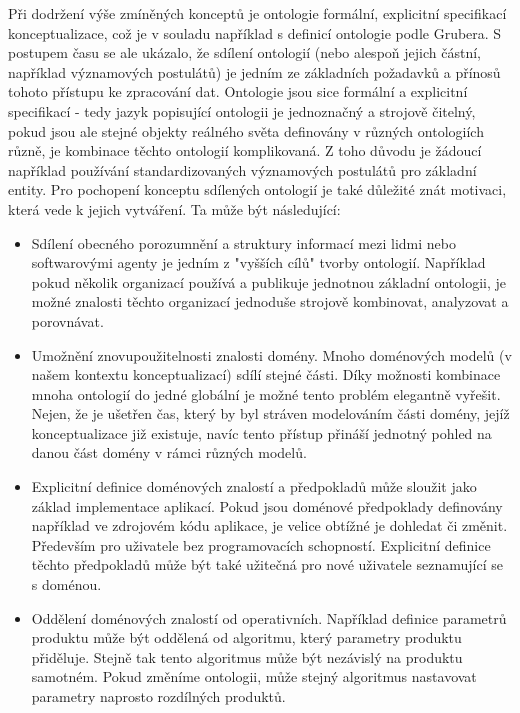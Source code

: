 \documentclass[11pt,twoside,a4paper]{book}
\begin{document}
		Při dodržení výše zmíněných konceptů je ontologie formální, explicitní specifikací konceptualizace, což je v souladu například s definicí ontologie podle Grubera\cite{ontologie01}. S postupem času se ale ukázalo, že sdílení ontologií (nebo alespoň jejich částní, například významových postulátů) je jedním ze základních požadavků a přínosů tohoto přístupu ke zpracování dat. Ontologie jsou sice formální a explicitní specifikací - tedy jazyk popisující ontologii je jednoznačný a strojově čitelný, pokud jsou ale stejné objekty reálného světa definovány v různých ontologiích různě, je kombinace těchto ontologií komplikovaná. Z toho důvodu je žádoucí například používání standardizovaných významových postulátů pro základní entity. Pro pochopení konceptu sdílených ontologií je také důležité znát motivaci, která vede k jejich vytváření. Ta může být následující:\cite{ontologieg07}
\begin{itemize}
\item{Sdílení obecného porozumnění a struktury informací mezi lidmi nebo softwarovými agenty je jedním z "vyšších cílů" tvorby ontologií. Například pokud několik organizací používá a publikuje jednotnou základní ontologii, je možné znalosti těchto organizací jednoduše strojově kombinovat, analyzovat a porovnávat.}
\item{Umožnění znovupoužitelnosti znalosti domény. Mnoho doménových modelů (v našem kontextu konceptualizací) sdílí stejné části. Díky možnosti kombinace mnoha ontologií do jedné globální je možné tento problém elegantně vyřešit. Nejen, že je ušetřen čas, který by byl stráven modelováním části domény, jejíž konceptualizace již existuje, navíc tento přístup přináší jednotný pohled na danou část domény v rámci různých modelů.}
\item{Explicitní definice doménových znalostí a předpokladů může sloužit jako základ implementace aplikací. Pokud jsou doménové předpoklady definovány například ve zdrojovém kódu aplikace, je velice obtížné je dohledat či změnit. Především pro uživatele bez programovacích schopností. Explicitní definice těchto předpokladů může být také užitečná pro nové uživatele seznamující se s doménou.}
\item{Oddělení doménových znalostí od operativních. Například definice parametrů produktu může být oddělená od algoritmu, který parametry produktu přiděluje. Stejně tak tento algoritmus může být nezávislý na produktu samotném. Pokud změníme ontologii, může stejný algoritmus nastavovat parametry naprosto rozdílných produktů.}
\end{itemize}  
\end{document}
